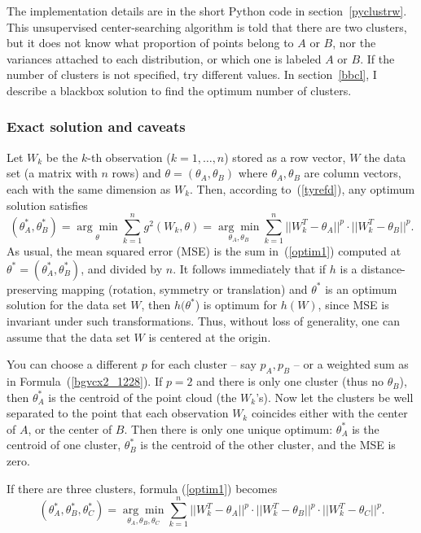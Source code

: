 \documentclass[oneside,10pt]{book}
\begin{document}
The implementation details are in the short
 Python code in section~\ref{pyclustrw}.  This unsupervised center-searching algorithm is told that there are two clusters, but it does not know what proportion of points belong to $A$ or $B$, nor the variances attached to
 each distribution, or which one is labeled $A$ or $B$. If the number of clusters is not specified, try different values. In section~\ref{bbcl}, I describe
 a blackbox solution to find the optimum number of clusters. 

\subsubsection{Exact solution and caveats}\label{exact5}

Let $W_k$ be the $k$-th observation ($k=1,\dots,n$) stored as a row vector, $W$ the data set (a matrix with $n$ rows) and $\theta=(\theta_A,\theta_B)$ where $\theta_A,\theta_B$ are column vectors, each with the same dimension as $W_k$. Then, according to~(\ref{tyrefd}),  any optimum solution satisfies
\begin{equation}
(\theta_A^*,\theta_B^*) = \underset{\theta}{\arg\min} \sum_{k=1}^n g^2(W_k,\theta)= \underset{\theta_A,\theta_B}{\arg\min} \sum_{k=1}^n ||W_k^T-\theta_A||^{p} \cdot ||W_k^T-\theta_B||^{p}. \label{optim1}
\end{equation}
 As usual, the \textcolor{index}{mean squared error} (MSE) is the sum in~(\ref{optim1}) computed at $\theta^*=(\theta_A^*,\theta_B^*)$, and divided by $n$. 
It follows immediately that if $h$ is a distance-preserving mapping (rotation, symmetry or translation) and $\theta^*$ is an optimum solution for the data set $W$, then $h(\theta^*$) is optimum for $h(W)$, since MSE is invariant under such transformations. Thus, without loss of generality, one can assume that the data set $W$ is centered at the origin.

You can choose a different $p$ for each cluster -- say $p_A,p_B$ -- or a weighted sum as in Formula~(\ref{bgvcx2_1228}). 
If $p=2$ and there is only one cluster (thus no $\theta_B$), then $\theta_A^*$ is the centroid of the point
 cloud (the $W_k$'s). Now let the clusters be well separated to the point that each observation $W_k$ coincides either with the center of $A$, or the center of $B$. 
Then there is only one unique optimum: $\theta_A^*$ is the centroid of one cluster, $\theta_B^*$ is the centroid of the other cluster, and the MSE is zero.

If there are three clusters, formula (\ref{optim1})  becomes
\begin{equation}
(\theta_A^*,\theta_B^*,\theta_C^*) = \underset{\theta_A,\theta_B,\theta_C}{\arg\min} \sum_{k=1}^n ||W_k^T-\theta_A||^{p} \cdot ||W_k^T-\theta_B||^{p} \cdot ||W_k^T-\theta_C||^{p}. \label{optim2}
\end{equation}
\end{document}
